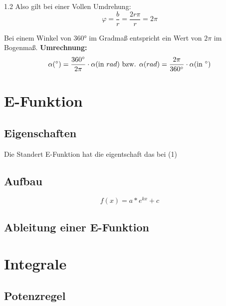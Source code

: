 \documentclass{article}
\newcommand{\Zeilenabstand}{1.2}
\begin{document}
\begin{spacing}{\Zeilenabstand}
    Also gilt bei einer Vollen Umdrehung:
    \begin{equation*}
        \varphi=\frac{b}{r}=\frac{2r\pi}{r}=2\pi
    \end{equation*}

    Bei einem Winkel von 360° im Gradmaß entspricht ein Wert von $2\pi$ im Bogenmaß.
    \textbf{Umrechnung:}
    \begin{equation*}
        \alpha(\degree)=\frac{360\degree}{2\pi}\cdot \alpha(\text{in }rad) \text{ bzw. } \alpha(rad)=\frac{2\pi}{360\degree}\cdot \alpha(\text{in }\degree)
    \end{equation*}

    \newpage

    \section{E-Funktion}

        \subsection{Eigenschaften}

            Die Standert E-Funktion hat die eigentschaft das bei (1)

        \subsection{Aufbau}


            \begin{equation}
                f(x) = a * e^{kx} + c    
            \end{equation}


        \subsection{Ableitung einer E-Funktion}

        








    \newpage


    \section{Integrale}

        \subsection{Potenzregel}


\end{spacing}
\end{document}
